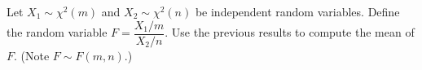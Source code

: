 Let $X_1 \sim \chi^2 (m)$ and $X_2 \sim \chi^2(n)$ be independent random variables. Define the random variable $F = \dfrac{X_1/m}{X_2/n}$. Use the previous results to compute the mean of $F$. (Note $F \sim F(m,n)$.)